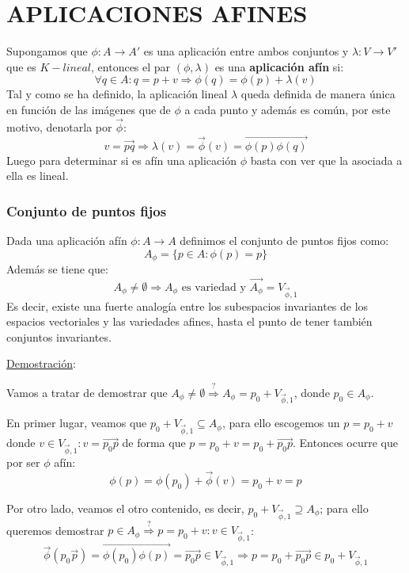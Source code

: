 \documentclass[10pt,a4paper,openright]{book}
\theoremstyle{break}
\begin{document}
\section*{APLICACIONES AFINES}
Supongamos que $\phi: A\rightarrow A'$ es una aplicación entre ambos conjuntos y $\lambda: V\rightarrow V'$ que es $K-lineal$, entonces el par $(\phi,\lambda)$ es una \textbf{aplicación afín} si:
$$\forall q \in A: q = p+v\Rightarrow \phi(q) = \phi(p)+\lambda(v)$$
Tal y como se ha definido, la aplicación lineal $\lambda$ queda definida de manera única en función de las imágenes que de $\phi$ a cada punto y además es común, por este motivo, denotarla por $\vec{\phi}$:
$$v=\vec{pq}\Rightarrow \lambda (v) = \vec{\phi}(v) = \overrightarrow{\phi(p)\phi(q)}$$
Luego para determinar si es afín una aplicación $\phi$ basta con ver que la asociada a ella es lineal.

\subsubsection*{Conjunto de puntos fijos}
Dada una aplicación afín $\phi: A\rightarrow A$ definimos el conjunto de puntos fijos como:
$$A_\phi = \{p\in A: \phi(p) = p\}$$
Además se tiene que:
$$A_\phi \neq \emptyset \Rightarrow A_\phi \mbox{ es variedad y } \overrightarrow{A_\phi} = V_{\vec{\phi}, 1}$$
Es decir, existe una fuerte analogía entre los subespacios invariantes de los espacios vectoriales y las variedades afines, hasta el punto de tener también conjuntos invariantes.

\underline{Demostración}:

Vamos a tratar de demostrar que $A_\phi \neq \emptyset \overset{?}{\Rightarrow} A_\phi = p_0 + V_{\vec{\phi}, 1} $, donde $p_0 \in A_\phi$.

En primer lugar, veamos que $p_0 + V_{\vec{\phi}, 1}  \subseteq A_\phi$, para ello escogemos un $p= p_0+v$ donde $v\in V_{\vec{\phi}, 1}:  v = \vec{p_0 p}$ de forma que $p = p_0 + v = p_0 + \vec{p_0 p}$. Entonces ocurre que por ser $\phi$ afín:
$$\phi(p) = \phi(p_0)  + \vec{\phi}(v) = p_0 + v = p$$

Por otro lado, veamos el otro contenido, es decir, $p_0 + V_{\vec{\phi}, 1}  \supseteq A_\phi$; para ello queremos demostrar $p \in A_\phi \overset{?}{\Rightarrow}  p = p_0 + v: v \in  V_{\vec{\phi}, 1}$:
$$\vec{\phi}(p_0 \vec{p}) = \overrightarrow{\phi(p_0) \phi(p)} = \vec{p_0 p}  \in V_{\vec{\phi}, 1} \Rightarrow p = p_0 + \vec{p_0 p} \in p_0 + V_{\vec{\phi}, 1} $$
\end{document}
